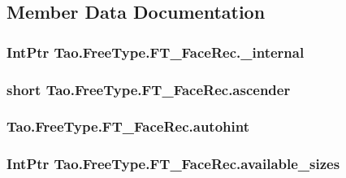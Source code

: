 \subsection{Member Data Documentation}
\hypertarget{struct_tao_1_1_free_type_1_1_f_t___face_rec_a05377c0453ea2bb828762633fa708745}{
\subsubsection[{\_\-internal}]{\setlength{\rightskip}{0pt plus 5cm}IntPtr {\bf Tao.FreeType.FT\_\-FaceRec.\_\-internal}}}
\label{struct_tao_1_1_free_type_1_1_f_t___face_rec_a05377c0453ea2bb828762633fa708745}
\hypertarget{struct_tao_1_1_free_type_1_1_f_t___face_rec_a16479aa5af0baec58671a9256a3e119c}{
\subsubsection[{ascender}]{\setlength{\rightskip}{0pt plus 5cm}short {\bf Tao.FreeType.FT\_\-FaceRec.ascender}}}
\label{struct_tao_1_1_free_type_1_1_f_t___face_rec_a16479aa5af0baec58671a9256a3e119c}
\hypertarget{struct_tao_1_1_free_type_1_1_f_t___face_rec_aa00903cea2af7dd47eff64fbb84707e9}{
\subsubsection[{autohint}]{ {\bf Tao.FreeType.FT\_\-FaceRec.autohint}}}
\label{struct_tao_1_1_free_type_1_1_f_t___face_rec_aa00903cea2af7dd47eff64fbb84707e9}
\hypertarget{struct_tao_1_1_free_type_1_1_f_t___face_rec_a53b91399ce836fc6a42b69cb94dbc9bd}{
\subsubsection[{available\_\-sizes}]{\setlength{\rightskip}{0pt plus 5cm}IntPtr {\bf Tao.FreeType.FT\_\-FaceRec.available\_\-sizes}}}
